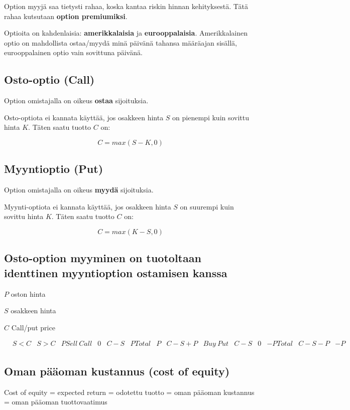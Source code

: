 \documentclass[a4paper]{article}
\begin{document}
Option myyjä saa tietysti rahaa, koska kantaa riskin hinnan kehityksestä. Tätä rahaa kutsutaan \textbf{option premiumiksi}.

Optioita on kahdenlaisia: \textbf{amerikkalaisia} ja \textbf{eurooppalaisia}. Amerikkalainen optio on mahdollista ostaa/myydä minä päivänä tahansa määräajan sisällä, eurooppalainen optio vain sovittuna päivänä.



\subsection{Osto-optio (Call)}

Option omistajalla on oikeus \textbf{ostaa} sijoituksia.

Osto-optiota ei kannata käyttää, jos osakkeen hinta $S$ on pienempi kuin sovittu hinta $K$. Täten saatu tuotto $C$ on:

\[ C = max(S - K, 0) \]

\subsection{Myyntioptio (Put)}

Option omistajalla on oikeus \textbf{myydä} sijoituksia.

Myynti-optiota ei kannata käyttää, jos osakkeen hinta $S$ on suurempi kuin sovittu hinta $K$. Täten saatu tuotto $C$ on:

\[ C = max(K - S, 0) \]

\subsection{Osto-option myyminen on tuotoltaan identtinen myyntioption ostamisen kanssa}

$P$ oston hinta

$S$ osakkeen hinta

$C$ Call/put price

\[
\begin{array}{lccl}
 & S < C & S > C & P
Sell\ Call & 0 & C - S & P
Total & P & C - S + P & 
Buy\ Put & C - S & 0 & -P
Total & C - S - P & -P &
\end{array}
\]

\subsection{Oman pääoman kustannus (cost of equity)}

Cost of equity = expected return = odotettu tuotto = oman pääoman kustannus = oman pääoman tuottovaatimus
\end{document}
